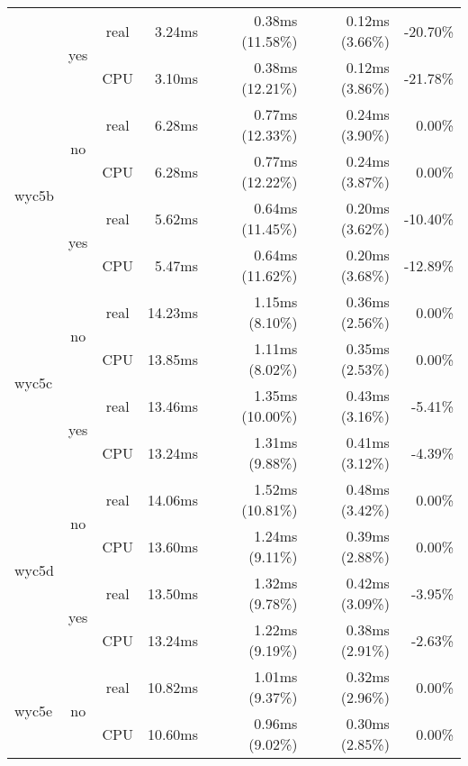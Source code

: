 \documentclass[en]{pracamgr}
\begin{document}
\begin{appendices}
\begin{small}
\begin{longtable}{|l|c|c|r|r|r|r|}
                          \cline{2-7}
                          & \multirow{2}{*}{yes} & real & 3.24ms & 0.38ms (11.58\%) & 0.12ms (3.66\%) & -20.70\% \\*
                          &                      & CPU  & 3.10ms & 0.38ms (12.21\%) & 0.12ms (3.86\%) & -21.78\% \\
\hline
\multirow{4}{*}{wyc5b}    & \multirow{2}{*}{no}  & real & 6.28ms & 0.77ms (12.33\%) & 0.24ms (3.90\%) & 0.00\% \\*
                          &                      & CPU  & 6.28ms & 0.77ms (12.22\%) & 0.24ms (3.87\%) & 0.00\% \\*
                          \cline{2-7}
                          & \multirow{2}{*}{yes} & real & 5.62ms & 0.64ms (11.45\%) & 0.20ms (3.62\%) & -10.40\% \\*
                          &                      & CPU  & 5.47ms & 0.64ms (11.62\%) & 0.20ms (3.68\%) & -12.89\% \\
\hline
\multirow{4}{*}{wyc5c}    & \multirow{2}{*}{no}  & real & 14.23ms & 1.15ms (8.10\%) & 0.36ms (2.56\%) & 0.00\% \\*
                          &                      & CPU  & 13.85ms & 1.11ms (8.02\%) & 0.35ms (2.53\%) & 0.00\% \\*
                          \cline{2-7}
                          & \multirow{2}{*}{yes} & real & 13.46ms & 1.35ms (10.00\%) & 0.43ms (3.16\%) & -5.41\% \\*
                          &                      & CPU  & 13.24ms & 1.31ms (9.88\%) & 0.41ms (3.12\%) & -4.39\% \\
\hline
\multirow{4}{*}{wyc5d}    & \multirow{2}{*}{no}  & real & 14.06ms & 1.52ms (10.81\%) & 0.48ms (3.42\%) & 0.00\% \\*
                          &                      & CPU  & 13.60ms & 1.24ms (9.11\%) & 0.39ms (2.88\%) & 0.00\% \\*
                          \cline{2-7}
                          & \multirow{2}{*}{yes} & real & 13.50ms & 1.32ms (9.78\%) & 0.42ms (3.09\%) & -3.95\% \\*
                          &                      & CPU  & 13.24ms & 1.22ms (9.19\%) & 0.38ms (2.91\%) & -2.63\% \\
\hline
\multirow{4}{*}{wyc5e}    & \multirow{2}{*}{no}  & real & 10.82ms & 1.01ms (9.37\%) & 0.32ms (2.96\%) & 0.00\% \\*
                          &                      & CPU  & 10.60ms & 0.96ms (9.02\%) & 0.30ms (2.85\%) & 0.00\% \\*

\end{longtable}
\end{small}
\end{appendices}
\end{document}
